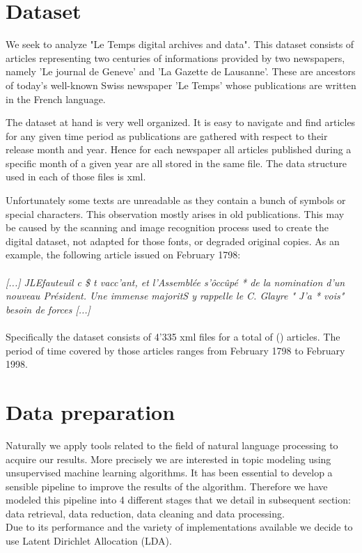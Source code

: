 \documentclass[11pt]{article}
\begin{document}
\section{Dataset}

We seek to analyze "Le Temps digital archives and data". This dataset consists of articles representing two centuries of informations provided by two newspapers, namely 'Le journal de Geneve' and 'La Gazette de Lausanne'. These are ancestors of today's well-known Swiss newspaper 'Le Temps' whose publications are written in the French language.

The dataset at hand is very well organized. It is easy to navigate and find articles for any given time
period as publications are gathered with respect to their release month and year. Hence for each newspaper all articles published during a specific month of a given year are all stored in the same file. The data structure used in each of those files is xml.

Unfortunately some texts are unreadable as they contain a bunch of symbols or special characters. This observation mostly arises in old publications. This may be caused by the scanning and image recognition process used to create the digital dataset, not adapted for those fonts, or degraded original copies. As an example, the following article issued on February 1798:\\
\\
\textit{[...] JLEfauteuil c \$ t vacc'ant, et l'Assemblée s'ôccûpé * de la nomination d'un nouveau Président. Une immense majoritS y rappelle le C. Glayre " J'a * vois" besoin de forces [...]}\\
\\
Specifically the dataset consists of 4'335 xml files for a total of () articles. The period of time covered by those articles ranges from February 1798 to February 1998.


\section{Data preparation}

Naturally we apply tools related to the field of natural language processing to acquire our results. More
precisely we are interested in topic modeling using unsupervised machine learning algorithms. It has been essential to develop
a sensible pipeline to improve the results of the algorithm. Therefore we have modeled this pipeline into 4 different stages that we detail in subsequent section: data retrieval, data reduction, data cleaning and data processing.
\\
Due to its performance and the variety of implementations available we decide to use Latent Dirichlet Allocation (LDA).
\end{document}
